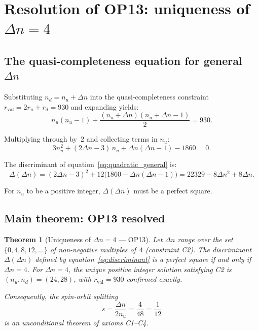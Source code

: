 \documentclass[12pt,a4paper]{article}
\newtheorem{theorem}{Theorem}[section]
\newcommand{\nuu}{n_u}
\newcommand{\ndd}{n_d}
\newcommand{\Dn}{\Delta n}
\newcommand{\rval}{r_{\mathrm{val}}}
\begin{document}
\section{Resolution of OP13: uniqueness of \texorpdfstring{$\Dn = 4$}{Delta n = 4}}
\label{sec:OP13}

\subsection{The quasi-completeness equation for general \texorpdfstring{$\Dn$}{Delta n}}

Substituting $\ndd = \nuu + \Dn$ into the quasi-completeness constraint $\rval = 2r_u + r_d = 930$ and expanding yields:
\begin{equation}
\nuu(\nuu-1) + \frac{(\nuu+\Dn)(\nuu+\Dn-1)}{2} = 930.
\label{eq:qc_general}
\end{equation}

Multiplying through by~2 and collecting terms in $\nuu$:
\begin{equation}
3\nuu^2 + (2\Dn - 3)\,\nuu + \Dn(\Dn-1) - 1860 = 0.
\label{eq:quadratic_general}
\end{equation}

The discriminant of equation~\eqref{eq:quadratic_general} is:
\begin{equation}
\Delta(\Dn) = (2\Dn-3)^2 + 12\bigl(1860 - \Dn(\Dn-1)\bigr) = 22329 - 8\Dn^2 + 8\Dn.
\label{eq:discriminant}
\end{equation}

For $\nuu$ to be a positive integer, $\Delta(\Dn)$ must be a perfect square.

\subsection{Main theorem: OP13 resolved}

\begin{theorem}[Uniqueness of $\Dn = 4$ --- OP13]
\label{thm:OP13}
Let $\Dn$ range over the set $\{0, 4, 8, 12, \ldots\}$ of non-negative multiples of~$4$ (constraint C2). The discriminant $\Delta(\Dn)$ defined by equation~\eqref{eq:discriminant} is a perfect square if and only if $\Dn = 4$. For $\Dn = 4$, the unique positive integer solution satisfying C2 is $(\nuu, \ndd) = (24, 28)$, with $\rval = 930$ confirmed exactly.

Consequently, the spin-orbit splitting
\begin{equation}
s = \frac{\Dn}{2\nuu} = \frac{4}{48} = \frac{1}{12}
\label{eq:splitting}
\end{equation}
is an unconditional theorem of axioms C1--C4.
\end{theorem}
\end{document}
